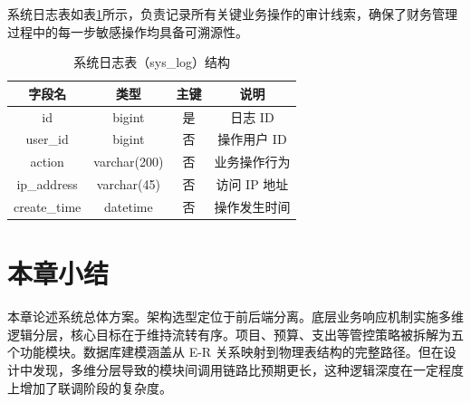 系统日志表如表\ref{tab:sys_log}所示，负责记录所有关键业务操作的审计线索，确保了财务管理过程中的每一步敏感操作均具备可溯源性。
\begin{table}[htbp]
    \centering
    \caption{系统日志表（sys\_log）结构}
    \label{tab:sys_log}
    \songti
    \begin{tabular}{cccc}
    \toprule
    字段名 & 类型 & 主键 & 说明 \\ \midrule
    id & bigint & 是 & 日志 ID \\
    user\_id & bigint & 否 & 操作用户 ID \\
    action & varchar(200) & 否 & 业务操作行为 \\
    ip\_address & varchar(45) & 否 & 访问 IP 地址 \\
    create\_time & datetime & 否 & 操作发生时间 \\ \bottomrule
    \end{tabular}
\end{table}

\section{本章小结}
本章论述系统总体方案。架构选型定位于前后端分离。底层业务响应机制实施多维逻辑分层，核心目标在于维持流转有序。项目、预算、支出等管控策略被拆解为五个功能模块。数据库建模涵盖从 E-R 关系映射到物理表结构的完整路径。但在设计中发现，多维分层导致的模块间调用链路比预期更长，这种逻辑深度在一定程度上增加了联调阶段的复杂度。
